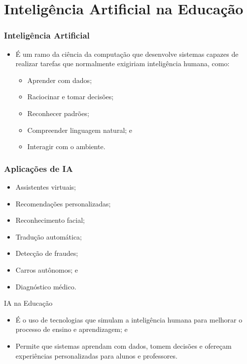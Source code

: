 \documentclass[aspectratio=169]{beamer} %
\begin{document}
\section{Inteligência Artificial na Educação}

\begin{frame}
	\frametitle{Inteligência Artificial}
	
	\begin{itemize}
		\item É um ramo da ciência da computação que desenvolve sistemas capazes de realizar tarefas que normalmente exigiriam inteligência humana, como:
		\begin{itemize}
			\item Aprender com dados;
			\item Raciocinar e tomar decisões;
			\item Reconhecer padrões;
			\item Compreender linguagem natural; e
			\item Interagir com o ambiente.
		\end{itemize}
	\end{itemize}
\end{frame}

\begin{frame}
	\frametitle{Aplicações de IA}
	
	\begin{itemize}
		\item Assistentes virtuais;
		\item Recomendações personalizadas;
		\item Reconhecimento facial;
		\item Tradução automática;
		\item Detecção de fraudes;
		\item Carros autônomos; e
		\item Diagnóstico médico.
	\end{itemize}
\end{frame}

\begin{frame}{IA na Educação}
	
	\begin{itemize}
		\item É o uso de tecnologias que simulam a inteligência humana para melhorar o processo de ensino e aprendizagem; e
		\item Permite que sistemas aprendam com dados, tomem decisões e ofereçam experiências personalizadas para alunos e professores.
	\end{itemize}
\end{frame}
\end{document}

